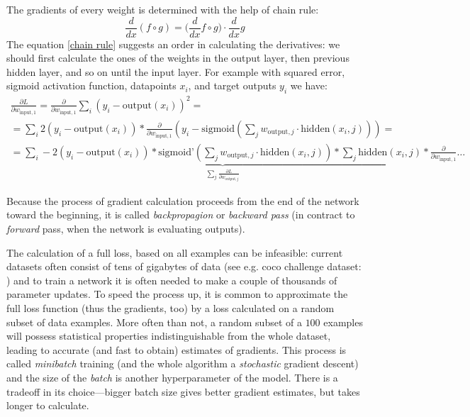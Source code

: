 The gradients of every weight is determined with the help of chain rule:
\begin{equation}\label{chain rule}
  \frac{d}{dx} (f \circ g) = (\frac{d}{dx} f \circ g\big) \cdot \frac{d}{dx}g
\end{equation}
The equation \eqref{chain rule} suggests an order in calculating the derivatives: we should first calculate the ones of the weights in the output layer, then previous hidden layer, and so on until the input layer. For example with squared error, sigmoid activation function, datapoints $x_i$, and target outputs $y_i$ we have:
\begin{multline}
  \frac{\partial L}{\partial w_{\text{input}, 1}} = \frac{\partial}{\partial w_{\text{input}, 1}} \sum_{i} (y_i - \text{output}(x_i))^2 =\\=  \sum_{i} 2(y_i - \text{output}(x_i)) * \frac{\partial}{\partial w_{\text{input}, 1}}
  ( y_i - \text{sigmoid}(\sum_j w_{\text{output}, j} \cdot \text{hidden}(x_i, j))) =\\=
  \underbrace{\sum_{i} -2(y_i - \text{output}(x_i)) * \text{sigmoid'}(\sum_j w_{\text{output}, j} \cdot \text{hidden}(x_i, j)) * \sum_j \text{hidden}(x_i, j)}_{\sum_j \frac{\partial L}{\partial w_{\text{output}, j}}} * \frac{\partial}{\partial w_{\text{input}, 1}}\ldots
\end{multline}

Because the process of gradient calculation proceeds from the end of the network toward the beginning, it is called \emph{backpropagion} or \emph{backward pass} (in contract to \emph{forward} pass, when the network is evaluating outputs).

The calculation of a full loss, based on all examples can be infeasible: current datasets often consist of tens of gigabytes of data (see e.g. coco challenge dataset: \cite{coco-dataset}) and to train a network it is often needed to make a couple of thousands of parameter updates.
To speed the process up, it is common to approximate the full loss function (thus the gradients, too) by a loss calculated on a random subset of data examples. More often than not, a random subset of a $100$ examples will possess statistical properties indistinguishable from the whole dataset, leading to accurate (and fast to obtain) estimates of gradients. This process is called \emph{minibatch} training (and the whole algorithm a \emph{stochastic} gradient descent) and the size of the \emph{batch} is another hyperparameter of the model. There is a tradeoff in its choice---bigger batch size gives better gradient estimates, but takes longer to calculate.


